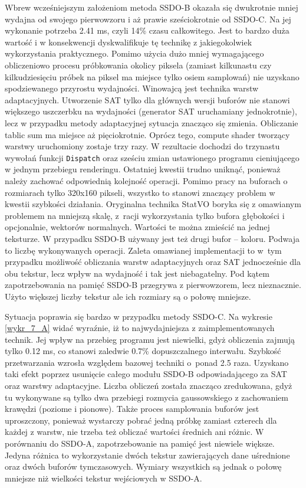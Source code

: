 		Wbrew wcześniejszym założeniom metoda SSDO-B okazała się dwukrotnie mniej wydajna od swojego pierwowzoru i aż prawie sześciokrotnie od SSDO-C. Na jej wykonanie potrzeba 2.41 ms, czyli 14\% czasu całkowitego. Jest to bardzo duża wartość i w konsekwencji dyskwalifikuje tę technikę z jakiegokolwiek wykorzystania praktycznego. Pomimo użycia dużo mniej wymagającego obliczeniowo procesu próbkowania okolicy piksela (zamiast kilkunastu czy kilkudziesięciu próbek na piksel ma miejsce tylko osiem samplowań) nie uzyskano spodziewanego przyrostu wydajności. Winowajcą jest technika warstw adaptacyjnych. Utworzenie SAT tylko dla głównych wersji buforów nie stanowi większego uszczerbku na wydajności (generator SAT uruchamiany jednokrotnie), lecz w przypadku metody adaptacyjnej sytuacja znacząco się zmienia. Obliczanie tablic sum ma miejsce aż pięciokrotnie. Oprócz tego, compute shader tworzący warstwy uruchomiony zostaje trzy razy. W rezultacie dochodzi do trzynastu wywołań funkcji \texttt{Dispatch} oraz sześciu zmian ustawionego programu cieniującego w jednym przebiegu renderingu. Ostatniej kwestii trudno uniknąć, ponieważ należy zachować odpowiednią kolejność operacji. Pomimo pracy na buforach o rozmiarach tylko 320x160 pikseli, wszystko to stanowi znaczący problem w kwestii szybkości działania. Oryginalna technika StatVO \cite{statvo} boryka się z omawianym problemem na mniejszą skalę, z~racji wykorzystania tylko bufora głębokości i opcjonalnie, wektorów normalnych. Wartości te można zmieścić na jednej teksturze. W przypadku SSDO-B używany jest też drugi bufor -- koloru. Podwaja to liczbę wykonywanych operacji. Zaleta omawianej implementacji to w~tym przypadku możliwość obliczania warstw adaptacyjnych oraz SAT jednocześnie dla obu tekstur, lecz wpływ na wydajność i tak jest niebagatelny. Pod kątem zapotrzebowania na pamięć SSDO-B przegrywa z pierwowzorem, lecz nieznacznie. Użyto większej liczby tekstur ale ich rozmiary są o połowę mniejsze.
		
		Sytuacja poprawia się bardzo w przypadku metody SSDO-C. Na wykresie \ref{wykr_7_A} widać wyraźnie, iż to najwydajniejsza z zaimplementowanych technik. Jej wpływ na przebieg programu jest niewielki, gdyż obliczenia zajmują tylko 0.12 ms, co stanowi zaledwie 0.7\% dopuszczalnego interwału. Szybkość przetwarzania wzrosła względem bazowej techniki o~ponad 2.5 raza. Uzyskano taki efekt poprzez usunięcie całego modułu SSDO-B odpowiadającego za SAT oraz warstwy adaptacyjne. Liczba obliczeń została znacząco zredukowana, gdyż tu wykonywane są tylko dwa przebiegi rozmycia gaussowskiego z zachowaniem krawędzi (poziome i pionowe). Także proces samplowania buforów jest uproszczony, ponieważ wystarczy pobrać jedną próbkę zamiast czterech dla każdej z warstw, nie trzeba też obliczać wartości średnich ani różnic.
		W porównaniu do SSDO-A, zapotrzebowanie na pamięć jest niewiele większe. Jedyna różnica to wykorzystanie dwóch tekstur zawierających dane uśrednione oraz dwóch buforów tymczasowych. Wymiary wszystkich są jednak o połowę mniejsze niż wielkości tekstur wejściowych w SSDO-A.
		
